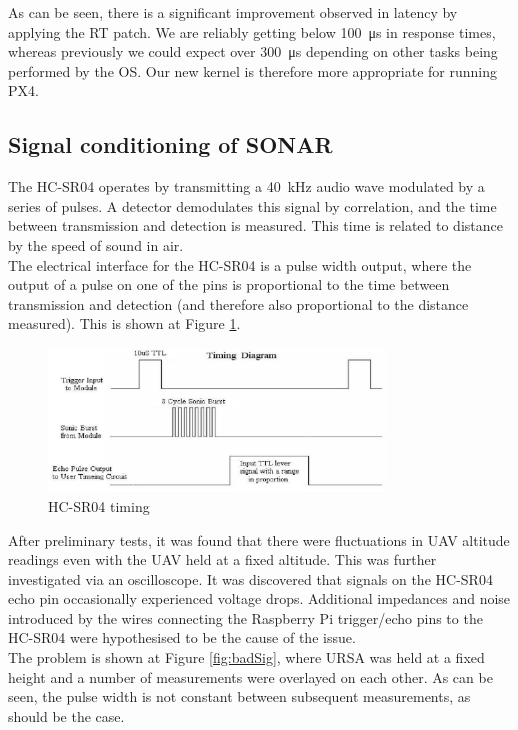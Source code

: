\documentclass[capstone_report.tex]{subfiles}
\begin{document}
    As can be seen, there is a significant improvement observed in latency by applying the RT patch. We are reliably getting below \SI{100}{\micro\second} in response times, whereas previously we could expect over \SI{300}{\micro\second} depending on other tasks being performed by the OS. Our new kernel is therefore more appropriate for running PX4.

    \subsection{Signal conditioning of SONAR}
 	The HC-SR04 operates by transmitting a \SI{40}{\kilo\hertz} audio wave modulated by a series of pulses. A detector demodulates this signal by correlation, and the time between transmission and detection is measured. This time is related to distance by the speed of sound in air.\\

    The electrical interface for the HC-SR04 is a pulse width output, where the output of a pulse on one of the pins is proportional to the time between transmission and detection (and therefore also proportional to the distance measured). This is shown at Figure \ref{fig:sr04}.

    \begin{figure}[H]
        \centering
        \includegraphics[width=0.8\textwidth]{imgs/sr04.png}
        \caption{HC-SR04 timing\label{fig:sr04}}
    \end{figure}

After preliminary tests, it was found that there were fluctuations in UAV altitude readings even with the UAV held at a fixed altitude. This was further investigated via an oscilloscope. It was discovered that signals on the HC-SR04 echo pin occasionally experienced voltage drops. Additional impedances and noise introduced by the wires connecting the Raspberry Pi trigger/echo pins to the HC-SR04 were hypothesised to be the cause of the issue. \\

The problem is shown at Figure \ref{fig:badSig}, where URSA was held at a fixed height and a number of measurements were overlayed on each other. As can be seen, the pulse width is not constant between subsequent measurements, as should be the case.\\
\end{document}
